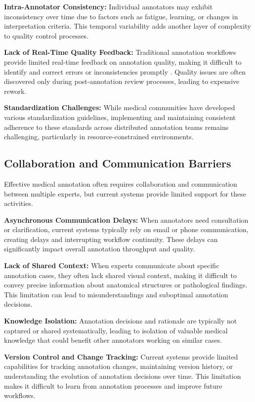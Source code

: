 \textbf{Intra-Annotator Consistency:} Individual annotators may exhibit inconsistency over time due to factors such as fatigue, learning, or changes in interpretation criteria. This temporal variability adds another layer of complexity to quality control processes.

\textbf{Lack of Real-Time Quality Feedback:} Traditional annotation workflows provide limited real-time feedback on annotation quality, making it difficult to identify and correct errors or inconsistencies promptly \cite{parker2022quality}. Quality issues are often discovered only during post-annotation review processes, leading to expensive rework.

\textbf{Standardization Challenges:} While medical communities have developed various standardization guidelines, implementing and maintaining consistent adherence to these standards across distributed annotation teams remains challenging, particularly in resource-constrained environments.

\subsection{Collaboration and Communication Barriers}

Effective medical annotation often requires collaboration and communication between multiple experts, but current systems provide limited support for these activities.

\textbf{Asynchronous Communication Delays:} When annotators need consultation or clarification, current systems typically rely on email or phone communication, creating delays and interrupting workflow continuity. These delays can significantly impact overall annotation throughput and quality.

\textbf{Lack of Shared Context:} When experts communicate about specific annotation cases, they often lack shared visual context, making it difficult to convey precise information about anatomical structures or pathological findings. This limitation can lead to misunderstandings and suboptimal annotation decisions.

\textbf{Knowledge Isolation:} Annotation decisions and rationale are typically not captured or shared systematically, leading to isolation of valuable medical knowledge that could benefit other annotators working on similar cases.

\textbf{Version Control and Change Tracking:} Current systems provide limited capabilities for tracking annotation changes, maintaining version history, or understanding the evolution of annotation decisions over time. This limitation makes it difficult to learn from annotation processes and improve future workflows.

